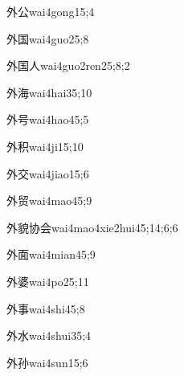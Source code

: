 \begin{verbete}{外公}{wai4gong1}{5;4}
\end{verbete}
\begin{verbete}{外国}{wai4guo2}{5;8}
\end{verbete}
\begin{verbete}{外国人}{wai4guo2ren2}{5;8;2}
\end{verbete}
\begin{verbete}{外海}{wai4hai3}{5;10}
\end{verbete}
\begin{verbete}{外号}{wai4hao4}{5;5}
\end{verbete}
\begin{verbete}{外积}{wai4ji1}{5;10}
\end{verbete}
\begin{verbete}{外交}{wai4jiao1}{5;6}
\end{verbete}
\begin{verbete}{外贸}{wai4mao4}{5;9}
\end{verbete}
\begin{verbete}{外貌协会}{wai4mao4xie2hui4}{5;14;6;6}
\end{verbete}
\begin{verbete}{外面}{wai4mian4}{5;9}
\end{verbete}
\begin{verbete}{外婆}{wai4po2}{5;11}
\end{verbete}
\begin{verbete}{外事}{wai4shi4}{5;8}
\end{verbete}
\begin{verbete}{外水}{wai4shui3}{5;4}
\end{verbete}
\begin{verbete}{外孙}{wai4sun1}{5;6}
\end{verbete}
